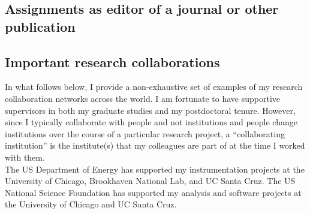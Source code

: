 \subsection{Assignments as editor of a journal or other publication \noneyet}\label{ssec:assignments-as-editor-of-a-journal-or-other-publication-noneyet}
\subsection{Important research collaborations}\label{ssec:important-research-collaborations}
In what follows below, I provide a non-exhaustive set of examples of my research collaboration networks across the world.
I am fortunate to have supportive supervisors in both my graduate studies and my postdoctoral tenure.
However, since I typically collaborate with people and not institutions and people change institutions over the course of a particular research project, a \enquote{collaborating institution} is the institute(s) that my colleagues are part of at the time I worked with them.\\

 The US Department of Energy has supported my instrumentation projects at the University of Chicago, Brookhaven National Lab, and UC Santa Cruz. The US National Science Foundation has supported my analysis and software projects at the University of Chicago and UC Santa Cruz.\\

\\



